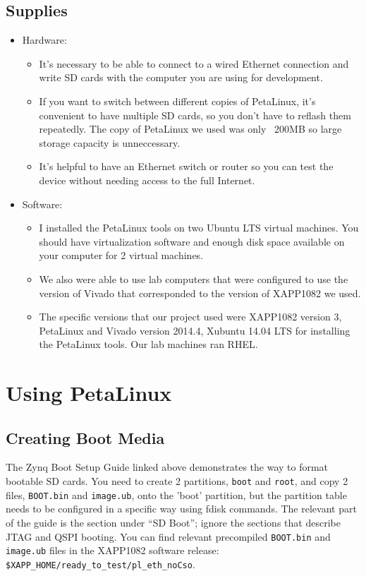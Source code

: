 \documentclass[12pt]{report}
\begin{document}
\subsection{Supplies}
\begin{itemize}
  \item Hardware:
    \begin{itemize}
    \item It's necessary to be able to connect to a wired Ethernet connection and write SD cards with the computer you are using for development.
    \item If you want to switch between different copies of PetaLinux, it's convenient to have multiple SD cards, so you don't have to reflash them repeatedly. The copy of PetaLinux we used was only ~200MB so large storage capacity is unneccessary.
    \item It's helpful to have an Ethernet switch or router so you can test the device without needing access to the full Internet.
    \end{itemize}
  \item Software:
    \begin{itemize}
    \item I installed the PetaLinux tools on two Ubuntu LTS virtual machines. You should have virtualization software and enough disk space available on your computer for 2 virtual machines.
    \item We also were able to use lab computers that were configured to use the version of Vivado that corresponded to the version of XAPP1082 we used.
    \item The specific versions that our project used were XAPP1082 version 3, PetaLinux and Vivado version 2014.4, Xubuntu 14.04 LTS for installing the PetaLinux tools. Our lab machines ran RHEL.
    \end{itemize}
\end{itemize}

\section{Using PetaLinux}
\subsection{Creating Boot Media}
The Zynq Boot Setup Guide linked above demonstrates the way to format bootable SD cards. You need to create 2 partitions, \texttt{boot} and \texttt{root}, and copy 2 files, \texttt{BOOT.bin} and \texttt{image.ub}, onto the 'boot' partition, but the partition table needs to be configured in a specific way using fdisk commands. The relevant part of the guide is the section under ``SD Boot''; ignore the sections that describe JTAG and QSPI booting. You can find relevant precompiled \texttt{BOOT.bin} and \texttt{image.ub} files in the XAPP1082 software release: \texttt{\$XAPP\_HOME/ready\_to\_test/pl\_eth\_noCso}.
\end{document}
